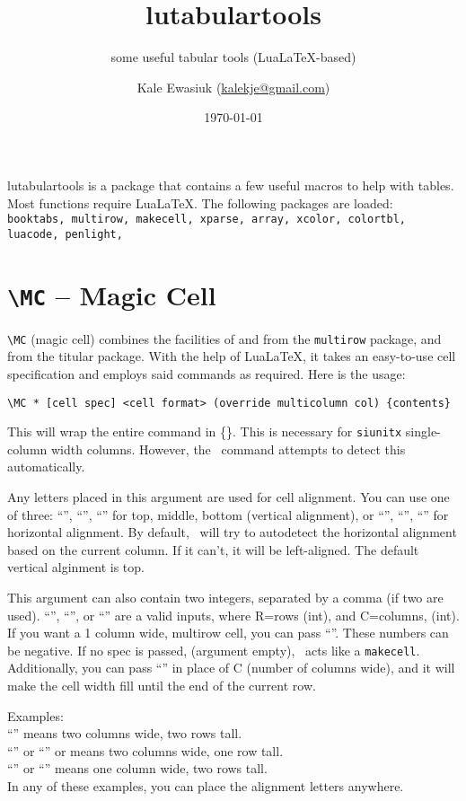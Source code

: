 \documentclass[11pt,parskip=half]{scrartcl}
\author{Kale Ewasiuk (\url{kalekje@gmail.com})}
\date{\today}
\title{lutabulartools}
\subtitle{some useful tabular tools (LuaLaTeX-based)}
\newcommand{\llcmd}[1]{\leavevmode\llap{\texttt{\detokenize{#1}\ }}}
\newcommand{\cmd}[1]{\texttt{\detokenize{#1}}}
\newcommand{\qcmd}[1]{``\cmd{#1}''}
\newcommand{\tMC}{\cmd{\\MC}}
\begin{document}
\maketitle

lutabulartools is a package that contains a few useful macros to help with tables.
Most functions require LuaLaTeX. The following packages are loaded:
\texttt{
{booktabs},
{multirow},
{makecell},
{xparse},
{array},
{xcolor},
{colortbl},
{luacode},
{penlight},
}

\section{\texttt{\textbackslash MC} -- Magic Cell}
\texttt{\textbackslash MC} (magic cell) combines the facilities of
\cmd{\multirow} and \cmd{\multicolumn} from the \texttt{multirow} package, and \cmd{\makcell} from the titular package.
With the help of LuaLaTeX, it takes an easy-to-use cell specification and employs said commands as required.
Here is the usage:

\texttt{\textbackslash MC * [cell spec] <cell format> (override multicolumn col) \{contents\} }

\llcmd{*}This will wrap the entire command in \{\}. This is necessary for \texttt{siunitx} single-column width columns.
However, the \tMC\  command attempts to detect this automatically.

\llcmd{[cell spec]}%
Any letters placed in this argument are used for cell alignment.
You can use one of three: \qcmd{t}, \qcmd{m}, \qcmd{b} for top, middle, bottom (vertical alignment),
or \qcmd{l}, \qcmd{c}, \qcmd{r} for horizontal alignment.
By default, \tMC\   will try to autodetect the horizontal alignment based on the current column.
If it can't, it will be left-aligned.
The default vertical alginment is top.

This argument can also contain two integers, separated by a comma (if two are used).
\qcmd{C,R}, \qcmd{C}, or \qcmd{,R} are a valid inputs,
where R=rows (int), and C=columns, (int).
If you want a 1 column wide, multirow cell,
you can pass \qcmd{,R}. These numbers can be negative.
If no spec is passed, (argument empty), \tMC\
acts like a \texttt{makecell}.
Additionally, you can pass \qcmd{+} in place of C (number of columns wide),
and it will make the cell width fill until the end of the current row.

Examples:\\
\qcmd{\MC[2,2]} means two columns wide, two rows tall.\\
\qcmd{\MC[2,1]} or \qcmd{\MC[2]} or  means two columns wide, one row tall.\\
\qcmd{\MC[1,2]} or \qcmd{\MC[,2]} means one column wide, two rows tall.\\
In any of these examples, you can place the alignment letters anywhere.
\end{document}

